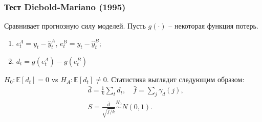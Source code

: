         \subsubsection{Тест Diebold-Mariano (1995)}
            Сравнивает прогнозную силу моделей. Пусть $g(\cdot)$ -- некоторая функция потерь.
            \begin{enumerate}
                \item $e_t^A = y_t - \hat y_t^A$, $e_t^B = y_t - \hat y_t^B$;
                \item $d_t =g(e^A_t) - g(e^B_t)$
            \end{enumerate}
            \noindent $H_0: \mathbb{E}\left[d_t\right] = 0$ vs $H_A: \mathbb{E}\left[d_t\right] \neq 0$. Статистика выглядит следующим образом:
            \begin{align*}
                & \bar d = \frac{1}{k}\sum_t d_t,\quad \bar f = \sum_j \gamma_d(j), \\
                & S = \frac{\bar d}{\sqrt{\bar f/k}} \overset{H_0}{\sim} N(0, 1).
            \end{align*}
